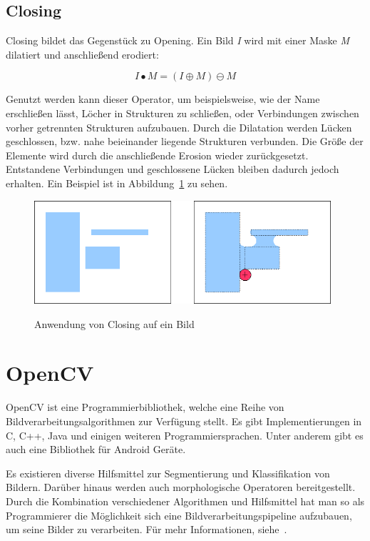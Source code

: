 \subsection{Closing}
Closing bildet das Gegenstück zu Opening.
Ein Bild {\em I} wird mit einer Maske {\em M} dilatiert und anschließend erodiert:

$$ I \bullet M = ( I \oplus M ) \ominus M $$

Genutzt werden kann dieser Operator, um beispielsweise, wie der Name erschließen lässt, Löcher in Strukturen zu schließen, oder Verbindungen zwischen vorher getrennten Strukturen aufzubauen.
Durch die Dilatation werden Lücken geschlossen, bzw. nahe beieinander liegende Strukturen verbunden. Die Größe der Elemente wird durch die anschließende Erosion wieder zurückgesetzt. Entstandene Verbindungen und geschlossene Lücken bleiben dadurch jedoch erhalten.
Ein Beispiel ist in Abbildung~\ref{fig:Closing} zu sehen.

\begin{figure}[ht]
   \centering
     \includegraphics[width=11cm]{Bilder/MorphologicalClosing} \\
 \caption{Anwendung von Closing auf ein Bild}
 \label{fig:Closing}
\end{figure}

\section{OpenCV} %
\label{sec:OpenCV}
OpenCV ist eine Programmierbibliothek, welche eine Reihe von Bildverarbeitungsalgorithmen zur Verfügung stellt.
Es gibt Implementierungen in C, C++, Java und einigen weiteren Programmiersprachen. Unter anderem gibt es auch eine Bibliothek für Android Geräte.

Es existieren diverse Hilfsmittel zur Segmentierung und Klassifikation von Bildern. Darüber hinaus werden auch morphologische Operatoren bereitgestellt. Durch die Kombination verschiedener Algorithmen und Hilfsmittel hat man so als Programmierer die Möglichkeit sich eine Bildverarbeitungspipeline aufzubauen, um seine Bilder zu verarbeiten. Für mehr Informationen, siehe~\cite{opencv}.

